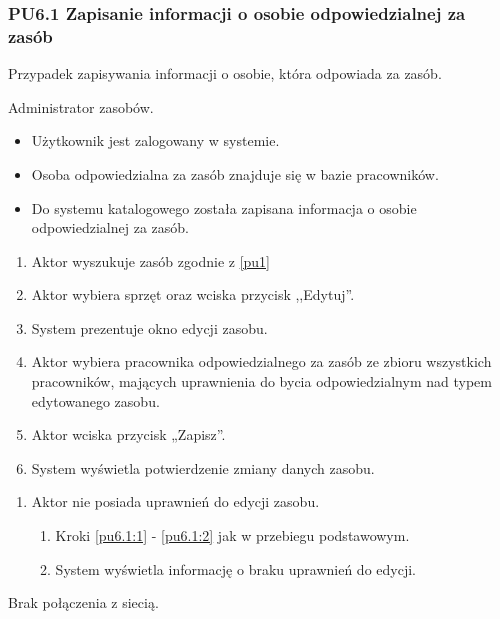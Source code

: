 \subsubsection{PU6.1 Zapisanie informacji o osobie odpowiedzialnej za zasób}
Przypadek zapisywania informacji o osobie, która odpowiada za zasób.

Administrator zasobów.

\begin{itemize}
\item Użytkownik jest zalogowany w systemie.
\item Osoba odpowiedzialna za zasób znajduje się w bazie pracowników.
\end{itemize}

\begin{itemize}
\item Do systemu katalogowego została zapisana informacja o osobie odpowiedzialnej za zasób.
\end{itemize}

\begin{enumerate}
	\item \label{pu6.1:1} Aktor wyszukuje zasób zgodnie z \ref{pu1}
	\item \label{pu6.1:2} Aktor wybiera sprzęt oraz wciska przycisk ,,Edytuj''.
	\item System prezentuje okno edycji zasobu.
	\item Aktor wybiera pracownika odpowiedzialnego za zasób ze zbioru wszystkich pracowników, mających uprawnienia do bycia odpowiedzialnym nad typem edytowanego zasobu.
	\item Aktor wciska przycisk „Zapisz”.
	\item System wyświetla potwierdzenie zmiany danych zasobu.
\end{enumerate}

\begin{enumerate}
	\item Aktor nie posiada uprawnień do edycji zasobu.
	\begin{enumerate}[label*=\arabic*.]
		\item Kroki \ref{pu6.1:1} - \ref{pu6.1:2} jak w przebiegu podstawowym.
		\item System wyświetla informację o braku uprawnień do edycji.
	\end{enumerate}
\end{enumerate}
Brak połączenia z siecią.

